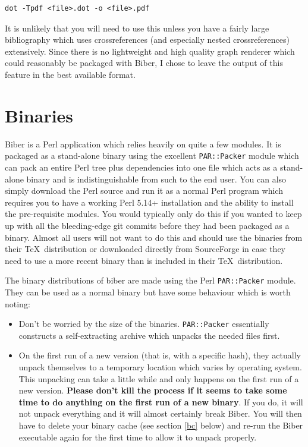 \documentclass{ltxdockit}
\begin{document}
\begin{verbatim}
dot -Tpdf <file>.dot -o <file>.pdf
\end{verbatim}

\noindent It is unlikely that you will need to use this unless you
have a fairly large bibliography which uses crossreferences (and
especially nested crossreferences) extensively. Since there is no
lightweight and high quality graph renderer which could reasonably be
packaged with Biber, I chose to leave the output of this feature in
the best available format.

\section{Binaries}\label{binaries}

Biber is a Perl application which relies heavily on quite a few
modules. It is packaged as a stand-alone binary using the excellent
\verb+PAR::Packer+ module which can pack an entire Perl tree plus
dependencies into one file which acts as a stand-alone binary and is
indistinguishable from such to the end user. You can also simply download
the Perl source and run it as a normal Perl program which
requires you to have a working Perl 5.14+ installation and the
ability to install the pre-requisite modules. You would typically only do
this if you wanted to keep up with all the bleeding-edge git commits before
they had been packaged as a binary. Almost all users will not want to do
this and should use the binaries from their \TeX\ distribution or downloaded
directly from SourceForge in case they need to use a more recent binary
than is included in their \TeX\ distribution.

The binary distributions of biber are made using the Perl \verb+PAR::Packer+
module. They can be used as a normal binary but have some behaviour which
is worth noting:

\begin{itemize}
\item Don't be worried by the size of the binaries. \verb+PAR::Packer+ essentially
  constructs a self-extracting archive which unpacks the needed files first.
\item On the first run of a new version (that is, with a specific hash),
  they actually unpack themselves to a temporary location which varies by
  operating system. This unpacking can take a little while and only happens
  on the first run of a new version. \textbf{Please don't kill the process
    if it seems to take some time to do anything on the first run of a new
    binary}. If you do, it will not unpack everything and it will almost
  certainly break Biber. You will then have to delete your binary
  cache (see section \ref{bc} below) and re-run the Biber executable
  again for the first time to allow it to unpack properly.
\end{itemize}
\end{document}
